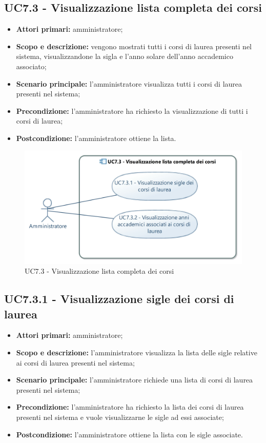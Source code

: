 \documentclass[AnalisiDeiRequisiti.tex]{subfiles}
\begin{document}
\subsection{UC7.3 - Visualizzazione lista completa dei corsi}
\begin{itemize}
	\item \textbf{Attori primari:} amministratore;
	\item \textbf{Scopo e descrizione:} vengono mostrati tutti i corsi di laurea presenti nel sistema, visualizzandone la sigla e l'anno solare dell'anno accademico associato;
	\item \textbf{Scenario principale:} l'amministratore visualizza tutti i corsi di laurea presenti nel sistema;
	\item \textbf{Precondizione:} l'amministratore ha richiesto la visualizzazione di tutti i corsi di laurea; 
	\item \textbf{Postcondizione:} l'amministratore ottiene la lista.
\end{itemize}
\begin{figure}[H]
	\centering
	\includegraphics[width=0.8\linewidth]{UC7_3.jpg}
	\caption{UC7.3 - Visualizzazione lista completa dei corsi}
	\label{fig:UC7.3 - Visualizzazione lista completa dei corsi}
\end{figure}
\subsection{UC7.3.1 - Visualizzazione sigle dei corsi di laurea}
\begin{itemize}
	\item \textbf{Attori primari:} amministratore;
	\item \textbf{Scopo e descrizione:} l'amministratore visualizza la lista delle sigle relative ai corsi di laurea presenti nel sistema;
	\item \textbf{Scenario principale:} l'amministratore richiede una lista di corsi di laurea presenti nel sistema;
	\item \textbf{Precondizione:} l'amministratore ha richiesto la lista dei corsi di laurea presenti nel sistema e vuole visualizzarne le sigle ad essi associate; 
	\item \textbf{Postcondizione:} l'amministratore ottiene la lista con le sigle associate.
\end{itemize}
\end{document}
